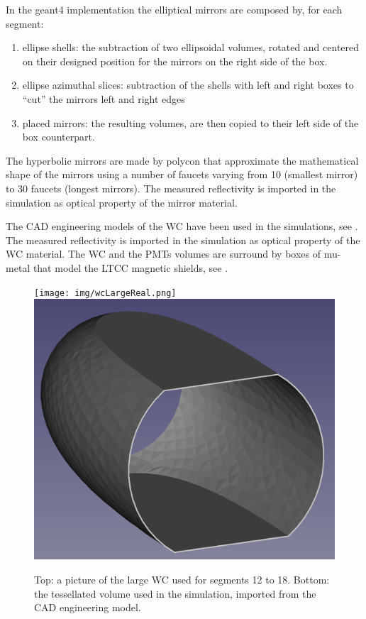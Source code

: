 In the geant4 implementation the elliptical mirrors are composed by, for each segment:

\begin{enumerate}
	\item ellipse shells: the subtraction of two ellipsoidal volumes, rotated and centered on their designed position for the mirrors on the right side of the box.
	\item ellipse azimuthal slices: subtraction of the shells with left and right boxes to ``cut'' the mirrors left and right edges
	\item placed mirrors: the resulting volumes,  are then copied to their left side of the box counterpart.
\end{enumerate}

The hyperbolic mirrors are made by polycon that approximate the mathematical shape of the mirrors using a number of faucets
varying from 10 (smallest mirror) to 30 faucets (longest mirrors). The measured reflectivity is imported in the simulation as
optical property of the mirror material.


The CAD engineering models of the WC have been used in the simulations, see . The measured reflectivity is imported in the simulation as
optical property of the WC material. The WC and the PMTs volumes are surround by boxes of mu-metal that model the LTCC magnetic shields, see .

\begin{figure}
	\centering
	\texttt{[image: img/wcLargeReal.png]}
	\includegraphics[width=0.95\columnwidth,keepaspectratio]{img/wcLargeSim.png}
	\caption{Top: a picture of the large WC used for segments 12 to 18. Bottom: the tessellated volume used in the
            simulation, imported from the CAD engineering model.}
	\label{fig:wcSimulation}
\end{figure}

